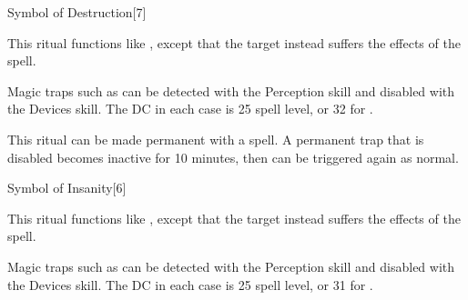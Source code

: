 \begin{spellsection}{Symbol of Destruction}[7]
    \begin{spellheader}
    \end{spellheader}
    \begin{spellcontent}
        \begin{spelltargetinginfo}
        \end{spelltargetinginfo}
        \begin{spelleffects}

            \spellspecial This ritual functions like , except that the target instead suffers the effects of the  spell.
        \end{spelleffects}
    \end{spellcontent}
    \begin{spellfooter}
        \spellnotes Magic traps such as  can be detected with the Perception skill and disabled with the Devices skill. The DC in each case is 25 \add spell level, or 32 for .
        \par This ritual can be made permanent with a  spell. A permanent trap that is disabled becomes inactive for 10 minutes, then can be triggered again as normal.
    \end{spellfooter}
\end{spellsection}

\begin{spellsection}{Symbol of Insanity}[6]
    \begin{spellheader}
    \end{spellheader}
    \begin{spellcontent}
        \begin{spelltargetinginfo}
        \end{spelltargetinginfo}
        \begin{spelleffects}

            \spellspecial This ritual functions like , except that the target instead suffers the effects of the  spell.
        \end{spelleffects}
    \end{spellcontent}
    \begin{spellfooter}
        \spellnotes Magic traps such as  can be detected with the Perception skill and disabled with the Devices skill. The DC in each case is 25 \add spell level, or 31 for .
    \end{spellfooter}
\end{spellsection}

